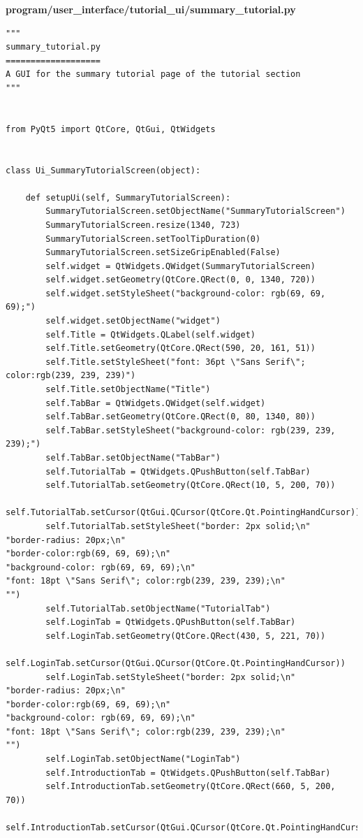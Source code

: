 \documentclass{article}
\begin{document}
\textbf{program/user\_interface/tutorial\_ui/summary\_tutorial.py}
\begin{lstlisting}
"""
summary_tutorial.py
===================
A GUI for the summary tutorial page of the tutorial section
"""


from PyQt5 import QtCore, QtGui, QtWidgets


class Ui_SummaryTutorialScreen(object):

    def setupUi(self, SummaryTutorialScreen):
        SummaryTutorialScreen.setObjectName("SummaryTutorialScreen")
        SummaryTutorialScreen.resize(1340, 723)
        SummaryTutorialScreen.setToolTipDuration(0)
        SummaryTutorialScreen.setSizeGripEnabled(False)
        self.widget = QtWidgets.QWidget(SummaryTutorialScreen)
        self.widget.setGeometry(QtCore.QRect(0, 0, 1340, 720))
        self.widget.setStyleSheet("background-color: rgb(69, 69, 69);")
        self.widget.setObjectName("widget")
        self.Title = QtWidgets.QLabel(self.widget)
        self.Title.setGeometry(QtCore.QRect(590, 20, 161, 51))
        self.Title.setStyleSheet("font: 36pt \"Sans Serif\"; color:rgb(239, 239, 239)")
        self.Title.setObjectName("Title")
        self.TabBar = QtWidgets.QWidget(self.widget)
        self.TabBar.setGeometry(QtCore.QRect(0, 80, 1340, 80))
        self.TabBar.setStyleSheet("background-color: rgb(239, 239, 239);")
        self.TabBar.setObjectName("TabBar")
        self.TutorialTab = QtWidgets.QPushButton(self.TabBar)
        self.TutorialTab.setGeometry(QtCore.QRect(10, 5, 200, 70))
        self.TutorialTab.setCursor(QtGui.QCursor(QtCore.Qt.PointingHandCursor))
        self.TutorialTab.setStyleSheet("border: 2px solid;\n"
"border-radius: 20px;\n"
"border-color:rgb(69, 69, 69);\n"
"background-color: rgb(69, 69, 69);\n"
"font: 18pt \"Sans Serif\"; color:rgb(239, 239, 239);\n"
"")
        self.TutorialTab.setObjectName("TutorialTab")
        self.LoginTab = QtWidgets.QPushButton(self.TabBar)
        self.LoginTab.setGeometry(QtCore.QRect(430, 5, 221, 70))
        self.LoginTab.setCursor(QtGui.QCursor(QtCore.Qt.PointingHandCursor))
        self.LoginTab.setStyleSheet("border: 2px solid;\n"
"border-radius: 20px;\n"
"border-color:rgb(69, 69, 69);\n"
"background-color: rgb(69, 69, 69);\n"
"font: 18pt \"Sans Serif\"; color:rgb(239, 239, 239);\n"
"")
        self.LoginTab.setObjectName("LoginTab")
        self.IntroductionTab = QtWidgets.QPushButton(self.TabBar)
        self.IntroductionTab.setGeometry(QtCore.QRect(660, 5, 200, 70))
        self.IntroductionTab.setCursor(QtGui.QCursor(QtCore.Qt.PointingHandCursor))

\end{lstlisting}
\end{document}
